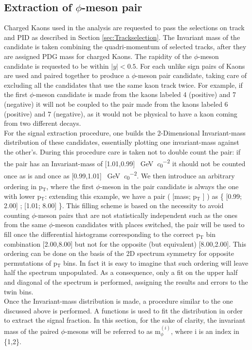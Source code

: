 \subsection{Extraction of $\phi$-meson pair}
Charged Kaons used in the analysis are requested to pass the selections on track and PID as described in Section \ref{sec:Trackselection}. The Invariant mass of the candidate is taken combining the quadri-momentum of selected tracks, after they are assigned PDG mass for charged Kaons. The rapidity of the $\phi$-meson candidate is requested to be within $|y| < 0.5$. For each unlike sign pairs of Kaons are used and paired together to produce a $\phi$-meson pair candidate, taking care of excluding all the candidates that use the same kaon track twice. For example, if the first $\phi$-meson candidate is made from the kaons labeled 4 (positive) and 7 (negative) it will not be coupled to the pair made from the kaons labeled 6 (positive) and 7 (negative), as it would not be physical to have a kaon coming from two different decays.\\
\indent For the signal extraction procedure, one builds the 2-Dimensional Invariant-mass distribution of these candidates, essentially plotting one invariant-mass against the other's. During this procedure care is taken not to double count the pair: if the pair has an Invariant-mass of [1.01,0.99] \SI{}{\giga\electronvolt\per\clight\squared} it should not be counted once as is and once as [0.99,1.01] \SI{}{\giga\electronvolt\per\clight\squared}. We then introduce an arbitrary ordering in p$_{\text{T}}$, where the first $\phi$-meson in the pair candidate is always the one with lower p$_{\text{T}}$: extending this example, we have a pair ( [mass; p$_{\text{T}}$ ] ) as  \{ [0.99; 2.00]  ; [1.01; 8.00] \}. This filling scheme is based on the necessity to avoid counting $\phi$-meson pairs that are not statistically independent such as the ones from the same $\phi$-meson candidates with places switched, the pair will be used to fill once the differential histograms corresponding to the correct p$_{\text{T}}$ bin combination [2.00,8.00] but not for the opposite (but equivalent) [8.00,2.00]. This ordering can be done on the basis of the 2D spectrum symmetry for opposite permutations of p$_{\text{T}}$ bins. In fact it is easy to imagine that such ordering will leave half the spectrum unpopulated. As a consequence, only a fit on the upper half and diagonal of the spectrum is performed, assigning the results and errors to the twin bins.\\
\indent Once the Invariant-mass distribution is made, a procedure similar to the one discussed above is performed. A functions is used to fit the distribution in order to extract the signal fraction. In this section, for the sake of clarity, the invariant mass of the paired $\phi$-mesons will be referred to as m$_{\phi}^{(i)}$, where i is an index in \{1,2\}.\\
